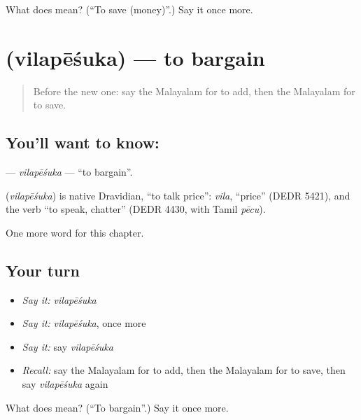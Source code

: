 \begin{tcolorbox}[breakable,colback=teal!4,colframe=teal!35!black,title={Before you move on}]
What does  mean? (\textquotedblleft{}To save (money)\textquotedblright{}.) Say it once more.
\end{tcolorbox}
\section[\texorpdfstring{\ml{വിലപേശുക} (vilapēśuka)}{വിലപേശുക (vilapēśuka)}]{ (vilapēśuka) — to bargain}

\label{lesson:ML-C303-vilapesuka}



\begin{quote}
Before the new one: say the Malayalam for to add, then the Malayalam for to save.
\end{quote}

\subsection*{You'll want to know: }
\textbf{} — \emph{vilapēśuka} — \textquotedblleft{}to bargain\textquotedblright{}.

\begin{cousinweb}
\textbf{} (\emph{vilapēśuka}) is native Dravidian, \textquotedblleft{}to talk price\textquotedblright{}: \emph{vila}, \textquotedblleft{}price\textquotedblright{} (DEDR 5421), and the verb \textquotedblleft{}to speak, chatter\textquotedblright{} (DEDR 4430, with Tamil \emph{pēcu}).
\end{cousinweb}

\begin{grammarlens}[title={What you've built}]
One more word for this chapter.
\end{grammarlens}

\subsection*{Your turn}
\begin{itemize}
\raggedright
  \item \emph{Say it:} \emph{vilapēśuka}
  \item \emph{Say it:} \emph{vilapēśuka}, once more
  \item \emph{Say it:} say \emph{vilapēśuka}
  \item \emph{Recall:} say the Malayalam for to add, then the Malayalam for to save, then say \emph{vilapēśuka} again
\end{itemize}

\begin{tcolorbox}[breakable,colback=teal!4,colframe=teal!35!black,title={Before you move on}]
What does  mean? (\textquotedblleft{}To bargain\textquotedblright{}.) Say it once more.
\end{tcolorbox}
